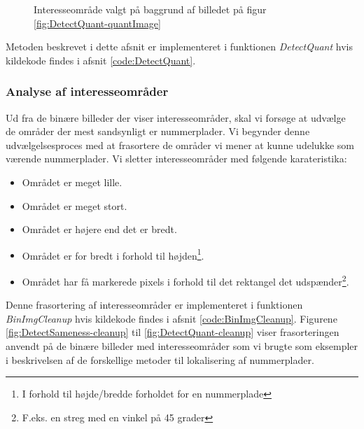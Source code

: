\begin{figure}[htp]
  \centering
  \caption{Interesseområde valgt på baggrund af billedet på figur \vref{fig:DetectQuant-quantImage}}
  \label{fig:DetectQuant-binary}  
\end{figure}

Metoden beskrevet i dette afsnit er implementeret i funktionen \textit{DetectQuant} hvis kildekode findes i afsnit \vref{code:DetectQuant}.




\subsubsection{Analyse af interesseområder}
\label{sec:kandidater}
Ud fra de binære billeder der viser interesseområder, skal vi forsøge at udvælge de områder der mest sandsynligt er nummerplader. Vi begynder denne udvælgelsesproces med at frasortere de områder vi mener at kunne udelukke som værende nummerplader. Vi sletter interesseområder med følgende karateristika:
\begin{itemize}
\item Området er meget lille.
\item Området er meget stort.
\item Området er højere end det er bredt.
\item Området er for bredt i forhold til højden\footnote{I forhold til højde/bredde forholdet for en nummerplade}.
\item Området har få markerede pixels i forhold til det rektangel det udspænder\footnote{F.eks. en streg med en vinkel på 45 grader}.
\end{itemize}

Denne frasortering af interesseområder er implementeret i funktionen \textit{BinImgCleanup} hvis kildekode findes i afsnit \ref{code:BinImgCleanup}. Figurene \ref{fig:DetectSameness-cleanup} til \ref{fig:DetectQuant-cleanup} viser frasorteringen anvendt på de binære billeder med interesseområder som vi brugte som eksempler i beskrivelsen af de forskellige metoder til lokalisering af nummerplader. 

